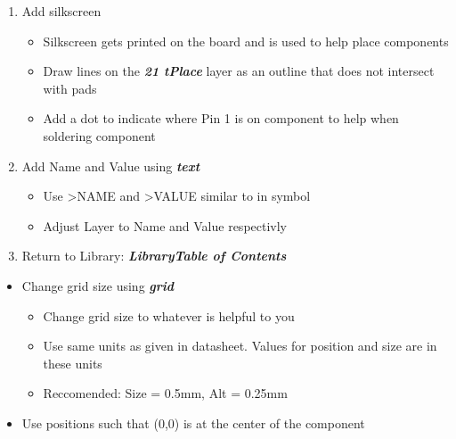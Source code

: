 \documentclass{article}
\begin{document}
\begin{enumerate}
    \item Add silkscreen
    \begin{itemize}
        \item Silkscreen gets printed on the board and is used to help place
        components
        \item Draw lines on the \textit{\textbf{21 tPlace}} layer as an outline
        that does not intersect with pads
        \item Add a dot to indicate where Pin 1 is on component to help when
        soldering component
    \end{itemize}
    \item Add Name and Value using \textit{\textbf{text}}
    \begin{itemize}
        \item Use \textgreater NAME and  \textgreater VALUE similar to in symbol
        \item Adjust Layer to Name and Value respectivly
    \end{itemize}
    \item Return to Library: \textit{\textbf{Library\textrightarrow Table
    of Contents}}
\end{enumerate}
\begin{tcolorbox} [title=Tips \& Tricks]
    \begin{itemize}
        \item Change grid size using \textit{\textbf{grid}}
        \begin{itemize}
            \item Change grid size to whatever is helpful to you
            \item Use same units as given in datasheet. Values for position and
            size are in these units
            \item Reccomended: Size = 0.5mm, Alt = 0.25mm
        \end{itemize}
        \item Use positions such that (0,0) is at the center of the component
    \end{itemize}
\end{tcolorbox}
\end{document}
